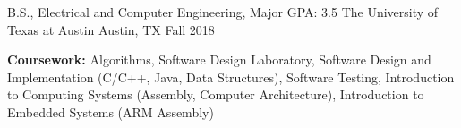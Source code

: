 \begin{cventries}
  \cventry
    {B.S., Electrical and Computer Engineering, Major GPA: 3.5}
    {The University of Texas at Austin}
    {Austin, TX}
    {Fall 2018}
    {
      \begin{cvitems}
        \item {\textbf{Coursework:} Algorithms, Software Design Laboratory, Software Design and Implementation (C/C++, Java, Data Structures), Software Testing, Introduction to Computing Systems (Assembly, Computer Architecture), Introduction to Embedded Systems (ARM Assembly)}
      \end{cvitems}
    }
\end{cventries}
